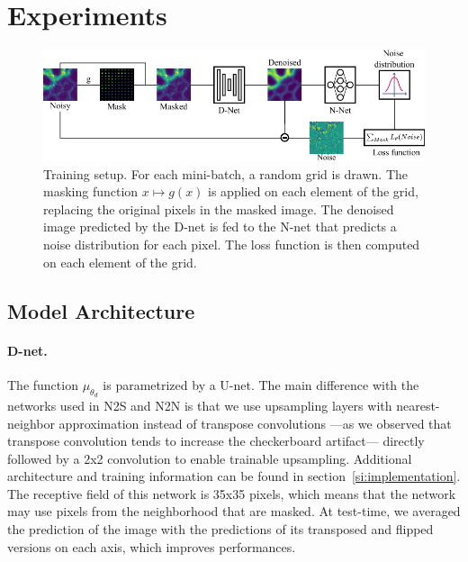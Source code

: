 \documentclass{article}
\begin{document}
\section{Experiments}
\begin{figure}[!htbp]
\vskip -0.1in
\begin{center}
\centerline{\includegraphics[width=\columnwidth]{fig_plomberie_1col.pdf}}
\caption{Training setup.
For each mini-batch, a random grid is drawn.
The masking function $x\mapsto g(x)$ is applied on each element of the grid, replacing the original pixels in the masked image.
The denoised image predicted by the D-net is fed to the N-net that predicts a noise distribution for each pixel.
The loss function is then computed on each element of the grid.
}
\label{fig:plumbing}
\end{center}
\end{figure}

\label{sec:experiments}
\subsection{Model Architecture}
\paragraph{D-net.}
The function $\mu_{\theta_d}$ is parametrized by a U-net. The main difference with the networks used in N2S and N2N is that we use upsampling layers with nearest-neighbor approximation instead of transpose convolutions ---as we observed that transpose convolution tends to increase the checkerboard artifact--- directly followed by a 2x2 convolution to enable trainable upsampling.
Additional architecture and training information can be found in section~\ref{si:implementation}.
The receptive field of this network is 35x35 pixels, which means that the network may use pixels from the neighborhood that are masked.
At test-time, we averaged the prediction of the image with the predictions of its transposed and flipped versions on each axis, which improves performances.
\end{document}
